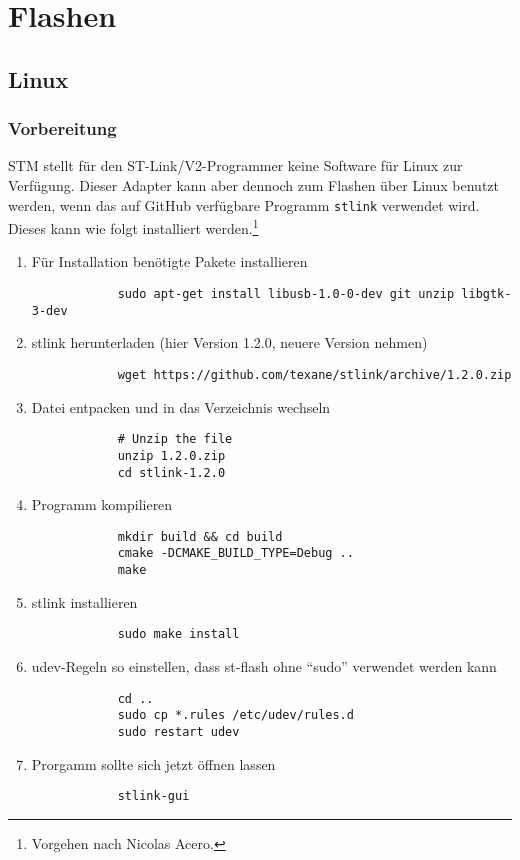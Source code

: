 

\chapter{Flashen}


\section{Linux}

\subsection{Vorbereitung}

STM stellt für den ST-Link/V2-Programmer keine Software für Linux zur Verfügung. Dieser Adapter kann aber dennoch zum Flashen über Linux benutzt werden, wenn das auf GitHub verfügbare Programm \texttt{stlink} verwendet wird. Dieses kann wie folgt installiert werden.\footnote{Vorgehen nach Nicolas Acero.}

\begin{enumerate}
	\item Für Installation benötigte Pakete installieren
		\begin{verbatim}
			sudo apt-get install libusb-1.0-0-dev git unzip libgtk-3-dev
		\end{verbatim}
	\item stlink herunterladen (hier Version 1.2.0, \ggf neuere Version nehmen)
		\begin{verbatim}
			wget https://github.com/texane/stlink/archive/1.2.0.zip
		\end{verbatim}
	\item Datei entpacken und in das Verzeichnis wechseln
		\begin{verbatim}
			# Unzip the file
			unzip 1.2.0.zip
			cd stlink-1.2.0
		\end{verbatim}
	\item Programm kompilieren
		\begin{verbatim}
			mkdir build && cd build
			cmake -DCMAKE_BUILD_TYPE=Debug ..
			make		
		\end{verbatim}
	\item stlink installieren
		\begin{verbatim}
			sudo make install
		\end{verbatim}
	\item udev-Regeln so einstellen, dass st-flash ohne "`sudo"' verwendet werden kann
		\begin{verbatim}
			cd ..
			sudo cp *.rules /etc/udev/rules.d
			sudo restart udev
		\end{verbatim}
	\item Prorgamm sollte sich jetzt öffnen lassen
		\begin{verbatim}
			stlink-gui
		\end{verbatim}
\end{enumerate}



